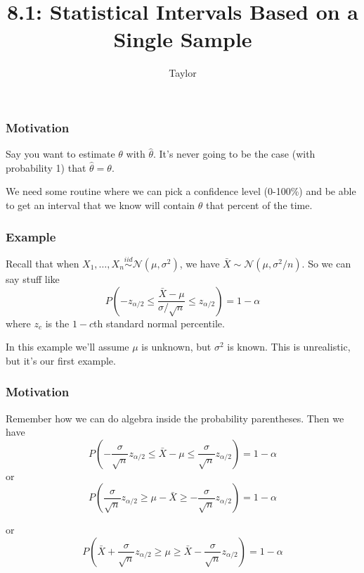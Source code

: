 \documentclass{beamer}
\title["8.1"]{8.1: Statistical Intervals Based on a Single Sample}
\author{Taylor}
\institute[UVA] 
{
University of Virginia \\
\medskip
\textit{} 
}
\date{}
\begin{document}

\begin{frame}
\titlepage 
\end{frame}

\begin{frame}
\frametitle{Motivation}

Say you want to estimate $\theta$ with $\hat{\theta}$. It's never going to be the case (with probability 1) that $\hat{\theta} = \theta$.
\newline

We need some routine where we can pick a confidence level (0-100\%) and be able to get an interval that we know will contain $\theta$ that percent of the time.

\end{frame}


\begin{frame}
\frametitle{Example}

Recall that when $X_1, \ldots, X_n \overset{iid}{\sim} \mathcal{N}(\mu, \sigma^2)$, we have $\bar{X} \sim \mathcal{N}(\mu, \sigma^2/n)$. So we can say stuff like
\[
P(- z_{\alpha/2} \le \frac{\bar{X} - \mu}{\sigma / \sqrt{n}} \le z_{ \alpha/2}) = 1 - \alpha
\]
where $z_c$ is the $1-c$th standard normal percentile.
\newline

In this example we'll assume $\mu$ is unknown, but $\sigma^2$ is known. This is unrealistic, but it's our first example.



\end{frame}

\begin{frame}
\frametitle{Motivation}
Remember how we can do algebra inside the probability parentheses. Then we have 
\[
P\left(- \frac{\sigma}{\sqrt{n}} z_{\alpha/2} \le \bar{X} - \mu \le \frac{\sigma}{\sqrt{n}} z_{ \alpha/2}\right) = 1 - \alpha
\]
or
\[
P\left(\frac{\sigma}{\sqrt{n}} z_{\alpha/2} \ge  \mu - \bar{X} \ge -\frac{\sigma}{\sqrt{n}} z_{ \alpha/2}\right) = 1 - \alpha
\]

or
\[
P\left(\bar{X} + \frac{\sigma}{\sqrt{n}} z_{\alpha/2} \ge  \mu  \ge \bar{X} -\frac{\sigma}{\sqrt{n}} z_{ \alpha/2}\right) = 1 - \alpha
\]


\end{frame}
\end{document}
